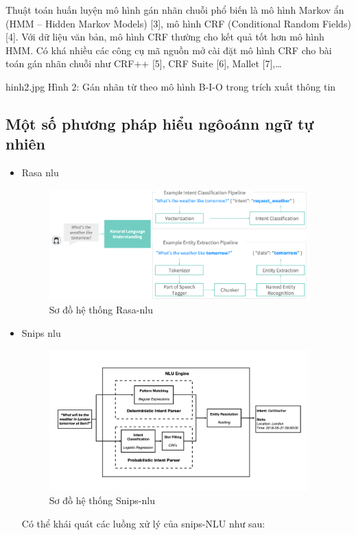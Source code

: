 Thuật toán huấn luyện mô hình gán nhãn chuỗi phổ biến là mô hình Markov ẩn (HMM – Hidden Markov Models) [3], mô hình CRF (Conditional Random Fields) [4]. Với dữ liệu văn bản, mô hình CRF thường cho kết quả tốt hơn mô hình HMM. Có khá nhiều các công cụ mã nguồn mở cài đặt mô hình CRF cho bài toán gán nhãn chuỗi như CRF++ [5], CRF Suite [6], Mallet [7],…


hinh2.jpg
Hình 2: Gán nhãn từ theo mô hình B-I-O trong trích xuất thông tin

\subsection{Một số phương pháp hiểu ngôoánn ngữ tự nhiên}
\begin{itemize}
    \item Rasa \ac{nlu}
          \begin{figure}[htp]
              \centering
              \includegraphics[width=10cm]{images/Rasa-NLU.png}
              \caption{Sơ đồ hệ thống Rasa-\ac{nlu}}
              \label{fig:rasa-nlu}
          \end{figure}
    \item Snips \ac{nlu}
          \begin{figure}[htp]
              \centering
              \includegraphics[width=10cm]{images/Snips-NLU.png}
              \caption{Sơ đồ hệ thống Snips-\ac{nlu}}
              \label{fig:snips-nlu}
          \end{figure}
          Có thể khái quát các luồng xử lý của snips-NLU \cite{snips-nlu} như sau:

\end{itemize}
